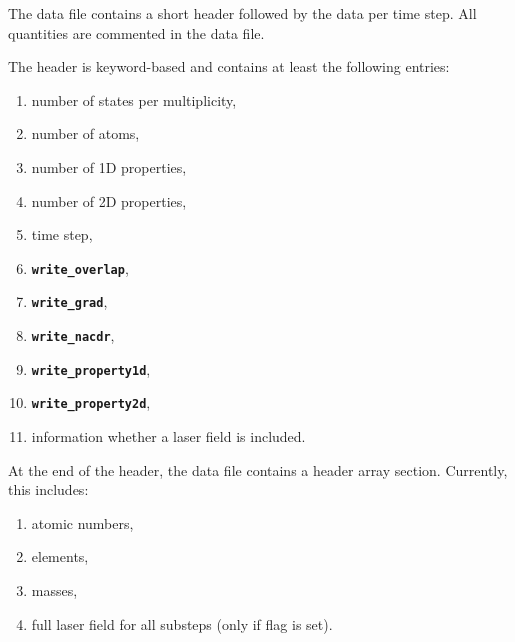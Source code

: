 \documentclass[a4paper,10pt,DIV=15,openany]{scrbook}
\newcommand{\ttt}[1]{\textbf{\texttt{#1}}}
\begin{document}
The data file contains a short header followed by the data per time step. All quantities are commented in the data file.

The header is keyword-based and contains at least the following entries:
\begin{enumerate}
  \item number of states per multiplicity,
  \item number of atoms,
  \item number of 1D properties,
  \item number of 2D properties,
  \item time step,
  \item \ttt{write\_overlap},
  \item \ttt{write\_grad},
  \item \ttt{write\_nacdr},
  \item \ttt{write\_property1d},
  \item \ttt{write\_property2d},
  \item information whether a laser field is included.
\end{enumerate}

At the end of the header, the data file contains a header array section. Currently, this includes:
\begin{enumerate}
  \item atomic numbers,
  \item elements,
  \item masses,
  \item full laser field for all substeps (only if flag is set).
\end{enumerate}
\end{document}
